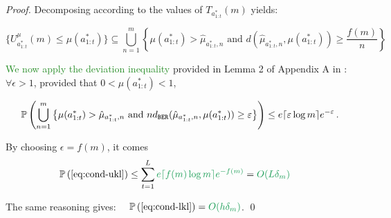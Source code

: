 \documentclass[runningheads]{llncs}
\newcommand{\citep}{\cite}
\newcommand{\diff}[1]{\textcolor{ForestGreen}{#1}}
\begin{document}
\begin{proof}
Decomposing according to the values of $T_{a^*_{1:t}}(m)$ yields:

\begin{equation*}
    \{U^{\mu}_{a^*_{1:t}}(m) \leq \mu(a^*_{1:t})\} \subseteq \bigcup_{n=1}^m \left\{ \mu(a^*_{1:t}) > \hat{\mu}_{a^*_{1:t}, n} \text{ and } d(\hat{\mu}_{a^*_{1:t}, n}, \mu(a^*_{1:t})) \geq \frac{f(m)}{n} \right\}
\end{equation*}

\diff{We now apply the deviation inequality} provided in Lemma 2 of Appendix A in \citep{Cappe2013}: $\forall \epsilon > 1$, provided that $0 < \mu(a^*_{1:t}) < 1$,

\begin{equation*}
\mathbb{P}\left(\bigcup_{n=1}^m \left\{ \mu(a^*_{1:t}) > \hat{\mu}_{a^*_{1:t}, n} \text{ and } n d_\texttt{BER}(\hat{\mu}_{a^*_{1:t}, n}, \mu(a^*_{1:t})) \geq \varepsilon \right\}\right) \leq e\lceil\varepsilon \log m\rceil e^{-\varepsilon}\,.
\end{equation*}

By choosing $\epsilon = f(m)$, it comes
\begin{align*}
    \probability{\eqref{eq:cond-ukl}} &\leq \sum_{t=1}^L \diff{e\ceil{f(m)\log m}e^{-f(m)}} = \diff{O(L\delta_m)}
\end{align*}

The same reasoning gives: $\quad\displaystyle{
    \probability{\eqref{eq:cond-lkl}} = \diff{O(h\delta_m)}}$.
\qed
\end{proof}
\end{document}
